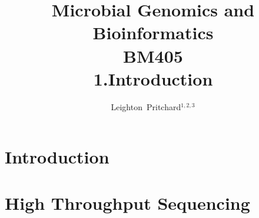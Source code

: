 

\title[Microbial Genomics and Bioinformatics: 1.Introduction] %
{Microbial Genomics and \\ Bioinformatics \\
BM405 \\
1.Introduction}
\author[Pritchard] %
{Leighton~Pritchard$^{1,2,3}$}
\subject{Bioinformatics, Genomics, Bacteria, Sequencing, Microbiology, Microbes}


\frame[plain]{\titlepage}



\section{Introduction}


\section{High Throughput Sequencing}




%


